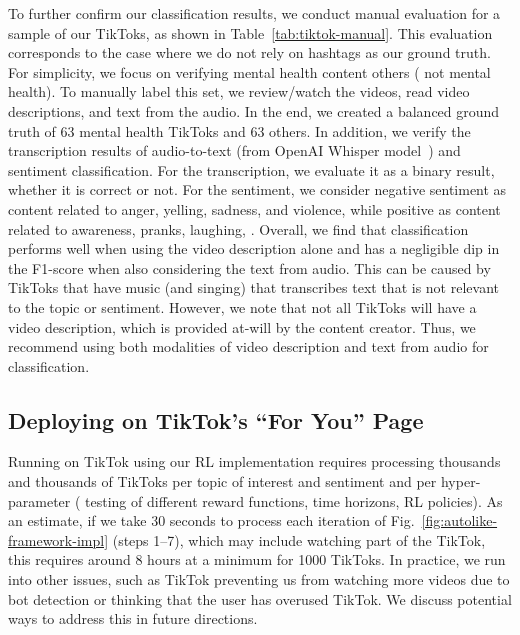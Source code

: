 To further confirm our classification results, we conduct manual evaluation for a sample of our TikToks, as shown in Table~\ref{tab:tiktok-manual}. This evaluation corresponds to the case where we do not rely on hashtags as our ground truth.
For simplicity, we focus on verifying mental health content \vs{} others (\ie{} not mental health). To manually label this set, we review/watch the videos, read video descriptions, and text from the audio. In the end, we created a balanced ground truth of 63 mental health TikToks and 63 others. 
In addition, we verify the transcription results of audio-to-text (from OpenAI Whisper model~\cite{openaiwhisper}) and sentiment classification. For the transcription, we evaluate it as a binary result, whether it is correct or not.
For the sentiment, we consider negative sentiment as content related to anger, yelling, sadness, and violence, while positive as content related to awareness, pranks, laughing, \etc{}. 
Overall, we find that classification performs well when using the video description alone and has a negligible dip in the F1-score when also considering the text from audio. This can be caused by TikToks that have music (and singing) that transcribes text that is not relevant to the topic or sentiment. %
However, we note that not all TikToks will have a video description, which is provided at-will by the content creator. Thus, we recommend using both modalities of video description and text from audio for classification.



\subsection{Deploying \autolike{} on TikTok's ``For You'' Page}
\label{sec:tiktok-eval}

Running \autolike{} on TikTok using our RL implementation requires processing thousands and thousands of TikToks per topic of interest and sentiment and per hyper-parameter (\eg{} testing of different reward functions, time horizons, RL policies). As an estimate, if we take 30 seconds to process each iteration of Fig.~\ref{fig:autolike-framework-impl} (steps 1--7), which may include watching part of the TikTok, this requires around 8 hours at a minimum for 1000 TikToks. In practice, we run into other issues, such as TikTok preventing us from watching more videos due to bot detection or thinking that the user has overused TikTok. We discuss potential ways to address this in future directions.



